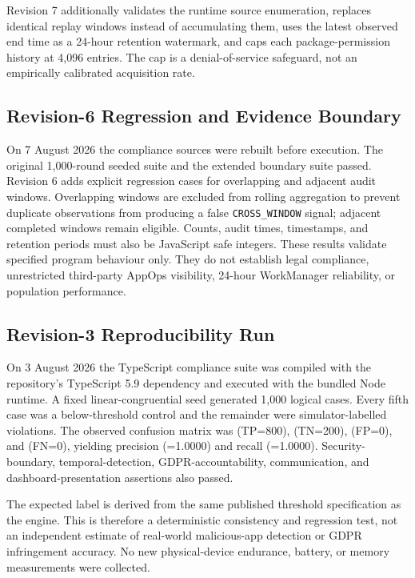 Revision 7 additionally validates the runtime source enumeration, replaces identical replay windows instead of accumulating them, uses the latest observed end time as a 24-hour retention watermark, and caps each package-permission history at 4,096 entries. The cap is a denial-of-service safeguard, not an empirically calibrated acquisition rate.

\subsection{Revision-6 Regression and Evidence Boundary}

On 7 August 2026 the compliance sources were rebuilt before execution. The original 1,000-round seeded suite and the extended boundary suite passed. Revision 6 adds explicit regression cases for overlapping and adjacent audit windows. Overlapping windows are excluded from rolling aggregation to prevent duplicate observations from producing a false \texttt{CROSS\_WINDOW} signal; adjacent completed windows remain eligible. Counts, audit times, timestamps, and retention periods must also be JavaScript safe integers. These results validate specified program behaviour only. They do not establish legal compliance, unrestricted third-party AppOps visibility, 24-hour WorkManager reliability, or population performance.

\subsection{Revision-3 Reproducibility Run}

On 3 August 2026 the TypeScript compliance suite was compiled with the repository's TypeScript 5.9 dependency and executed with the bundled Node runtime. A fixed linear-congruential seed generated 1,000 logical cases. Every fifth case was a below-threshold control and the remainder were simulator-labelled violations. The observed confusion matrix was (TP=800), (TN=200), (FP=0), and (FN=0), yielding precision (=1.0000) and recall (=1.0000). Security-boundary, temporal-detection, GDPR-accountability, communication, and dashboard-presentation assertions also passed.

The expected label is derived from the same published threshold specification as the engine. This is therefore a deterministic consistency and regression test, not an independent estimate of real-world malicious-app detection or GDPR infringement accuracy. No new physical-device endurance, battery, or memory measurements were collected.

